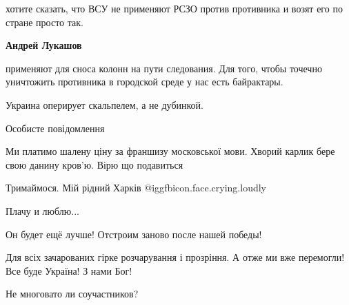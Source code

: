 \begin{itemize}
\begin{itemize}
хотите сказать, что ВСУ не применяют РСЗО против противника и возят его по
стране просто так.

\textbf{Андрей Лукашов} 

применяют для сноса колонн на пути следования. Для того, чтобы точечно
уничтожить противника в городской среде у нас есть байрактары.

Украина оперирует скальпелем, а не дубинкой.

\end{itemize} %

Особисте повідомлення


Ми платимо шалену ціну за франшизу московської мови. Хворий карлик бере свою
данину кров'ю. Вірю що подавиться


Тримаймося. Мій рідний Харків  @igg{fbicon.face.crying.loudly} 

Плачу и люблю...

Он будет ещё лучше!
Отстроим заново после нашей победы!

Для всіх зачарованих гірке розчарування і прозріння.
А отже ми вже перемогли!
Все буде Україна!
З нами Бог!

Не многовато ли соучастников?

\end{itemize} %
